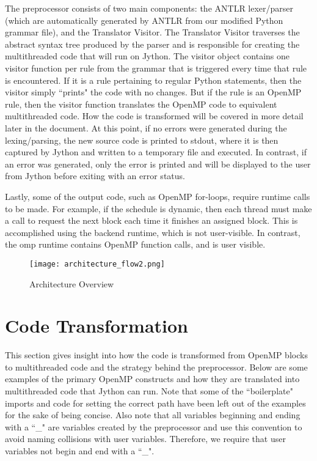 \documentclass[letterpaper,12pt]{article} %
\begin{document}
The preprocessor consists of two main components: the ANTLR lexer/parser (which are automatically generated by ANTLR from our modified Python grammar file), and the Translator Visitor. The Translator Visitor traverses the abstract syntax tree produced by the parser and is responsible for creating the multithreaded code that will run on Jython. The visitor object contains one visitor function per rule from the grammar that is  triggered every time that rule is encountered. If it is a rule pertaining to regular Python statements, then the visitor simply ``prints" the code with no changes. But if the rule is an OpenMP rule, then the visitor function translates the OpenMP code to equivalent multithreaded code. How the code is transformed will be covered in more detail later in the document. At this point, if no errors were generated during the lexing/parsing, the new source code is printed to stdout, where it is then captured by Jython and written to a temporary file and executed. In contrast, if an error was generated, only the error is printed and will be displayed to the user from Jython before exiting with an error status.  

Lastly, some of the output code, such as OpenMP for-loops, require runtime calls to be made. For example, if the schedule is dynamic, then each thread must make a call to request the next block each time it finishes an assigned block. This is accomplished using the backend runtime, which is not user-visible. In contrast, the omp runtime contains OpenMP function calls, and is user visible.  


\begin{figure} [H]
    \centering
          {\texttt{[image: architecture\_flow2.png]}}
        \caption{Architecture Overview}
        \label{fig:arch_flow}
    \centering
\end{figure}


\section{Code Transformation}
This section gives insight into how the code is transformed from OpenMP blocks to multithreaded code and the strategy behind the preprocessor. Below are some examples of the primary OpenMP constructs and how they are translated into multithreaded code that Jython can run. Note that some of the ``boilerplate" imports and code for setting the correct path have been left out of the examples for the sake of being concise. Also note that all variables beginning and ending with a ``\_" are variables created by the preprocessor and use this convention to avoid naming collisions with user variables. Therefore, we require that user variables not begin and end with a ``\_".
\end{document}
